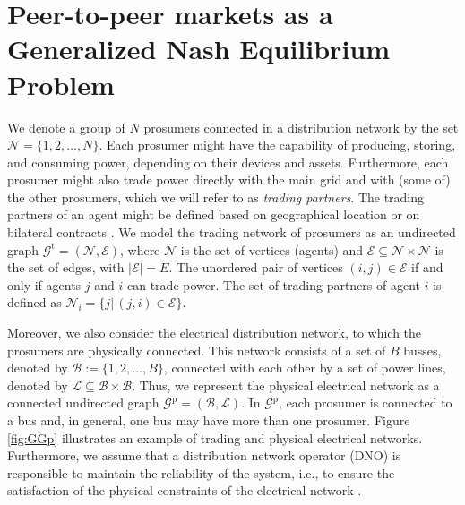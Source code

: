 \documentclass{IEEEtran}  %
\newcommand{\mc}{\mathcal}
\newcommand{\0}{\mathbf{0}}
\newcommand{\1}{\mathbf{1}}
\begin{document}
\section{Peer-to-peer markets as a Generalized Nash Equilibrium Problem}
\label{sub:setup}

We denote a group of $N$ prosumers connected in a distribution network by the set $\mc N = \{1,2,\dots, N \}$. Each prosumer might have the capability of producing, storing, and consuming power, depending on their devices and assets. Furthermore, each prosumer might also trade power directly with the main grid and with (some of) the other prosumers, which we will refer to as \textit{trading partners}. The trading partners of an agent might be defined based on geographical location or on bilateral contracts \cite{sousa2019}. 
%
We model the trading network of prosumers as an undirected graph  $\mc G^{\mathrm{t}} =(\mc N,\mc E)$, where $\mc N $ is the set of vertices (agents) and $\mc E \subseteq \mc N \times \mc N$ is the set of edges, with $|\mc E |= E$. The unordered pair of vertices $(i,j) \in \mc E$ if and only if agents $j$ and $i$ can trade power. The set of trading partners of agent $i$ is defined as $ \mc N_i = \{ j | \, (j,i)\in \mc E \}$.   


Moreover, we also consider the electrical distribution network, to which the prosumers are physically connected. This network consists of a set of $B$ busses, denoted by $\mc B:=\{1,2,\dots,B\}$, connected with each other by a set of power lines, denoted by $\mc L\subseteq \mc B \times \mc B$. Thus, we represent the physical electrical network as a connected undirected graph $\mc G^{\mathrm{p}}=(\mc B, \mc L)$. In $\mc G^{\mathrm{p}}$, each prosumer  is connected to a bus and, in general, one bus may have more than one prosumer. Figure \ref{fig:GGp} illustrates an example of trading and physical electrical networks. Furthermore, we assume that a distribution network operator (DNO) is responsible to maintain the reliability of the system, i.e., to ensure the satisfaction of the physical constraints of the electrical network \cite{qin2018,morstyn2019,moret2020}. 
\color{black}
\end{document}
